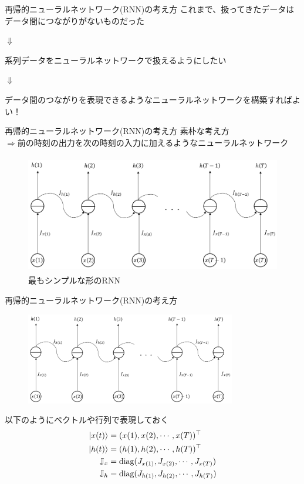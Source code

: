 \documentclass[dvipdfmx,10pt]{beamer}
\begin{document}
  \begin{frame}{再帰的ニューラルネットワーク(RNN)の考え方}
    これまで、扱ってきたデータはデータ間につながりがないものだった
    \begin{center}
      $\Downarrow$
    \end{center}
    系列データをニューラルネットワークで扱えるようにしたい\\
    \begin{center}
      $\Downarrow$
    \end{center}
    データ間のつながりを表現できるようなニューラルネットワークを構築すればよい！
  \end{frame}

  \begin{frame}{再帰的ニューラルネットワーク(RNN)の考え方}
    素朴な考え方\\
    $\Rightarrow$前の時刻の出力を次の時刻の入力に加えるようなニューラルネットワーク
    \begin{figure}
      \begin{center}
        \includegraphics[height=5.2cm]{simple_RNN.png}
      \end{center} 
      \caption{最もシンプルな形のRNN}  
    \end{figure}
  \end{frame}

  \begin{frame}{再帰的ニューラルネットワーク(RNN)の考え方}
    \begin{figure}
      \begin{center}
        \includegraphics[height=4cm]{simple_RNN.png}
      \end{center} 
    \end{figure}
    以下のようにベクトルや行列で表現しておく
    \begin{align*}
      \ket{x(t)} &= (x(1),x(2),\cdots,x(T))^{\top}\\
      \ket{h(t)} &= (h(1),h(2),\cdots,h(T))^{\top}\\
      \mathbb{J}_x &= \text{diag}(J_{x(1)},J_{x(2)},\cdots,J_{x(T)})\\
      \mathbb{J}_h &= \text{diag}(J_{h(1)},J_{h(2)},\cdots,J_{h(T)})
    \end{align*}
  \end{frame}
\end{document}
